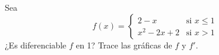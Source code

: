 \item Sea
$$f(x) = \begin{cases} 
2 - x & \text{si } x \le 1 \\ 
x^2 - 2x + 2 & \text{si } x > 1 
\end{cases}$$
¿Es diferenciable $f$ en 1? Trace las gráficas de $f$ y $f'$.

